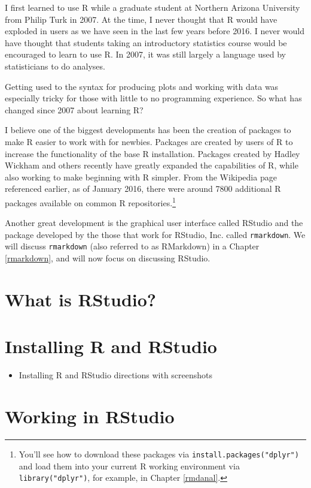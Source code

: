 \documentclass[]{tufte-book}
\providecommand{\tightlist}{%
  \setlength{\itemsep}{0pt}\setlength{\parskip}{0pt}}
\begin{document}
I first learned to use R while a graduate student at Northern Arizona
University from Philip Turk in 2007. At the time, I never thought that R
would have exploded in users as we have seen in the last few years
before 2016. I never would have thought that students taking an
introductory statistics course would be encouraged to learn to use R. In
2007, it was still largely a language used by statisticians to do
analyses.

Getting used to the syntax for producing plots and working with data was
especially tricky for those with little to no programming experience. So
what has changed since 2007 about learning R?

I believe one of the biggest developments has been the creation of
packages to make R easier to work with for newbies. Packages are created
by users of R to increase the functionality of the base R installation.
Packages created by Hadley Wickham and others recently have greatly
expanded the capabilities of R, while also working to make beginning
with R simpler. From the Wikipedia page referenced earlier, as of
January 2016, there were around 7800 additional R packages available on
common R repositories.\footnote{You'll see how to download these
  packages via \texttt{install.packages("dplyr")} and load them into
  your current R working environment via \texttt{library("dplyr")}, for
  example, in Chapter \ref{rmdanal}.}

Another great development is the graphical user interface called RStudio
and the package developed by the those that work for RStudio, Inc.
called \texttt{rmarkdown}. We will discuss \texttt{rmarkdown} (also
referred to as RMarkdown) in a Chapter \ref{rmarkdown}, and will now
focus on discussing RStudio.

\section{What is RStudio?}\label{what-is-rstudio}

\section{Installing R and RStudio}\label{installing-r-and-rstudio}

\begin{itemize}
\tightlist
\item
  Installing R and RStudio directions with screenshots
\end{itemize}

\section{Working in RStudio}\label{working-in-rstudio}
\end{document}
